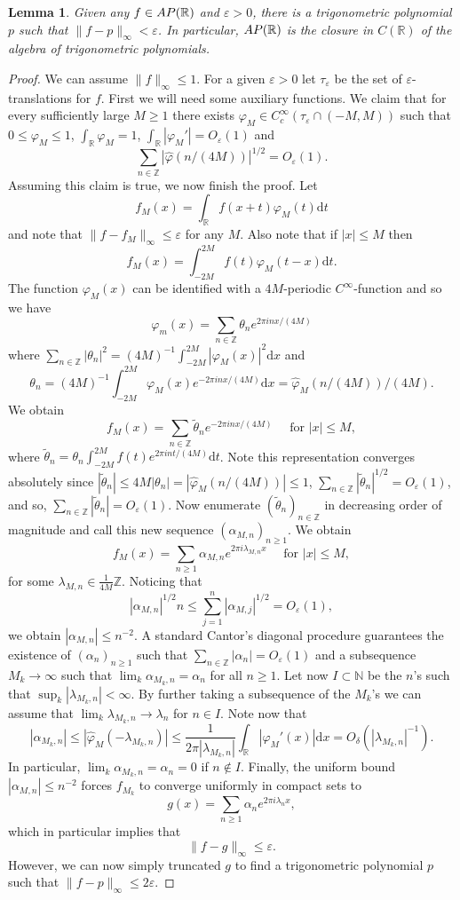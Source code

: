 \documentclass[a4paper,reqno,12pt]{amsart}
\newtheorem{lemma}[theorem]{Lemma}
\newcommand{\n}{\mathbb{N}}
\newcommand{\z}{\mathbb{Z}}
\renewcommand{\r}{\mathbb{R}}
\newcommand{\ft}{\widehat}
\newcommand{\wt}{\widetilde}
\newcommand{\la}{\lambda}
\newcommand{\al}{\alpha}
\newcommand{\ep}{\varepsilon}
\newcommand{\p}{\varphi}
\renewcommand{\d}{\mathrm{d}}
\newcommand{\1}{{\bf 1}}
\newcommand{\apr}{{\rm AP}(\r)}
\renewcommand{\1}{{\bo 1}}
\begin{document}
\begin{lemma}\label{lem:polyaprox}
Given any $f\in \apr$ and $\ep>0$, there is a trigonometric polynomial $p$ such that $\|f-p\|_\infty<\ep$. In particular, $\apr$ is the closure in $C(\r)$ of the algebra of trigonometric polynomials. 
\end{lemma}
\begin{proof}
We can assume $\|f\|_\infty\leq 1$. For a given $\ep>0$ let $\tau_\ep$ be the set of $\ep$-translations for $f$.  First we will need some auxiliary functions. We claim that for every sufficiently large $M\geq 1$ there exists $\p_M\in C^\infty_c(\tau_\ep \cap (-M,M))$ such that $0\leq \p_M\leq 1$, $\int_\r \p_M =1$, $\int_\r |\p_M'| =O_{\ep}(1)$ and 
$$
\sum_{n\in \z} |\ft \p(n/(4M))|^{1/2} = O_{\ep}(1).
$$
Assuming this claim is true, we now finish the proof. Let
$$
f_M(x) = \int_\r f(x+t)\p_M(t)\d t
$$
and note that $\|f-f_M\|_\infty\leq \ep$ for any $M$. Also note that if $|x|\leq M$ then
$$
f_M(x)=  \int_{-2M}^{2M} f(t)\p_M(t-x)\d t. 
$$
The function $\p_M(x)$ can be identified with a $4M$-periodic  $C^\infty$-function and so we have
$$
\p_m(x)=\sum_{n\in\z} \theta_n e^{2\pi i n x/(4M)}
$$
where $\sum_{n\in \z} |\theta_n|^2 = (4M)^{-1}\int_{-2M}^{2M} |\p_M(x)|^2\d x$ and 
$$
\theta_n = (4M)^{-1}\int_{-2M}^{2M} \p_M(x)e^{-2\pi i n x/(4M)}\d x = \ft \p_M(n/(4M))/(4M).
$$
We obtain
$$
f_M(x) = \sum_{n\in\z} \wt \theta_n e^{-2\pi i n x/(4M)}  \quad \text{ for } |x|\leq M,
$$
where $\wt \theta_n = \theta_n \int_{-2M}^{2M}f(t) e^{2\pi i n t/(4M)}\d t$. Note this representation converges absolutely since $ |\wt \theta_n| \leq  4M|\theta_n| = |\ft \p_M(n/(4M))| \leq 1$, $\sum_{n\in\z} |\wt \theta_n|^{1/2} = O_{\ep}(1)$, and so, $\sum_{n\in\z} |\wt \theta_n|=O_{\ep}(1)$. Now enumerate $(\wt \theta_n)_{n\in \z}$ in decreasing order of magnitude and call this new sequence $(\al_{M,n})_{n\geq 1}$.  We obtain
$$
f_M(x) = \sum_{n\geq 1} \al_{M,n} e^{2\pi i \la_{M,n} x}  \quad \text{ for } |x|\leq M,
$$
for some $\la_{M,n}\in \frac{1}{4M}\z$. Noticing that 
$$
|\al_{M,n}|^{1/2}n \leq \sum_{j=1}^n |\al_{M,j}|^{1/2} = O_{\ep}(1),
$$
we obtain $|\al_{M,n}|\leq n^{-2}$. A standard Cantor's diagonal procedure guarantees the existence of $(\al_n)_{n\geq 1}$ such that $\sum_{n\in\z} |\al_n| = O_{\ep}(1)$ and a subsequence $M_k\to\infty$ such that $\lim_k \al_{M_k,n}=\al_n$ for all $n\geq 1$.  Let now $I\subset \n$ be the $n$'s such that $\sup_{k} |\la_{M_k,n}| < \infty$.  By further taking a subsequence of the $M_k$'s we can assume that $\lim_k \la_{M_k,n} \to \la_n$ for $n\in I$.  Note now that
$$
|\al_{M_k,n}| \leq |\ft \p_M(-\la_{M_k,n})|  \leq  \frac{1}{2\pi |\la_{M_k,n}|} \int_{\r} |\p_M'(x)|\d x  = O_\delta(|\la_{M_k,n}|^{-1}).
$$
In particular, $\lim_k \al_{M_k,n} = \al_n=0$ if $n\notin I$. Finally, the uniform bound $|\al_{M,n}|\leq n^{-2}$ forces $f_{M_k}$ to converge uniformly in compact sets to 
$$
g(x) =  \sum_{n\geq 1} \al_{n} e^{2\pi i \la_{n} x},
$$
which in particular implies that
$$
\|f-g\|_\infty \leq \ep.
$$
However, we can now simply truncated $g$ to find a trigonometric polynomial $p$ such that $\|f-p\|_\infty \leq 2\ep$.


\end{proof}
\end{document}
